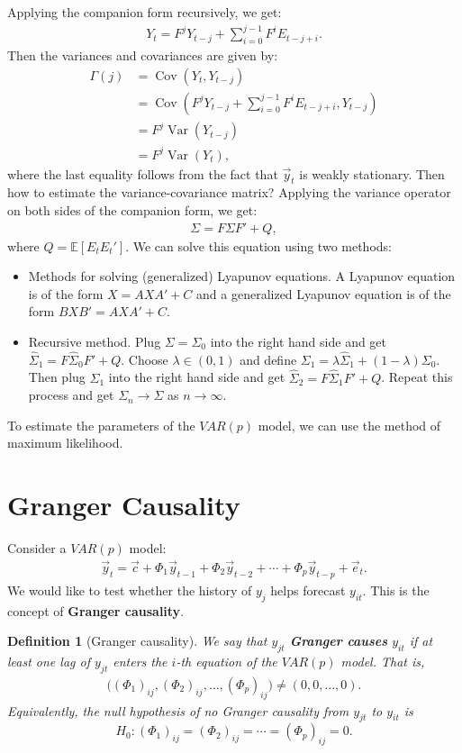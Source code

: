 \documentclass[12pt]{article}
\newtheorem{definition}{Definition}
\begin{document}
Applying the companion form recursively, we get:
\begin{align*}
    Y_t = F^j Y_{t-j} + \sum_{i=0}^{j-1} F^i E_{t-j+i}.
\end{align*}
Then the variances and covariances are given by:
\begin{align*}
    \Gamma(j) &= \operatorname{Cov}(Y_t, Y_{t-j})\\
    &= \operatorname{Cov}(F^j Y_{t-j} + \sum_{i=0}^{j-1} F^i E_{t-j+i}, Y_{t-j})\\
    &= F^j \operatorname{Var}(Y_{t-j})\\
    &= F^j \operatorname{Var}(Y_t),
\end{align*}
where the last equality follows from the fact that $\vec{y}_t$ is weakly stationary. Then how to estimate the variance-covariance matrix? Applying the variance operator on both sides of the companion form, we get:
\begin{align*}
    \Sigma = F \Sigma F' + Q,
\end{align*}
where $Q = \mathbb{E}[E_t E_t']$. We can solve this equation using two methods:
\begin{itemize}
    \item Methods for solving (generalized) Lyapunov equations. A Lyapunov equation is of the form $X = A X A' + C$ and a generalized Lyapunov equation is of the form $B X B' = A X A' + C$.
    \item Recursive method. Plug $\Sigma = \Sigma_0$ into the right hand side and get $\hat{\Sigma}_1 = F \hat{\Sigma}_0 F' + Q$. Choose $\lambda \in (0,1)$ and define $\Sigma_1 = \lambda \hat{\Sigma}_1 + (1-\lambda) \Sigma_0$. Then plug $\Sigma_1$ into the right hand side and get $\hat{\Sigma}_2 = F \hat{\Sigma}_1 F' + Q$. Repeat this process and get $\Sigma_n \to \Sigma$ as $n \to \infty$.
\end{itemize}

To estimate the parameters of the $VAR(p)$ model, we can use the method of maximum likelihood. 

\section{Granger Causality}
Consider a $VAR(p)$ model:
\begin{align*}
    \vec{y}_t = \vec{c} + \Phi_1 \vec{y}_{t-1} + \Phi_2 \vec{y}_{t-2} + \cdots + \Phi_p \vec{y}_{t-p} + \vec{e}_t.
\end{align*}
We would like to test whether the history of $y_{j}$ helps forecast $y_{it}$. This is the concept of \textbf{Granger causality}.
\begin{definition}[Granger causality]
    We say that $y_{jt}$ \textbf{Granger causes} $y_{it}$ if at least one lag of $y_{jt}$ enters the $i$-th equation of the $VAR(p)$ model. That is,
    \begin{align*}
        \big((\Phi_1)_{ij},(\Phi_2)_{ij},\ldots,(\Phi_p)_{ij}\big) \neq (0,0,\ldots,0).
    \end{align*}
    Equivalently, the null hypothesis of no Granger causality from $y_{jt}$ to $y_{it}$ is
    \[
        H_0:(\Phi_1)_{ij}=(\Phi_2)_{ij}=\cdots=(\Phi_p)_{ij}=0.
    \]
\end{definition}
\end{document}
